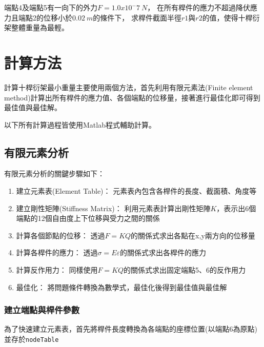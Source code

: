 \documentclass[12pt,a4paper]{article}
\begin{document}
    端點4及端點5有一向下的外力$F = 1.0x10^-7\ N$，
    在所有桿件的應力不超過降伏應力且端點2的位移小於$0.02\ m$的條件下，
    求桿件截面半徑$r1$與$r2$的值，使得十桿衍架整體重量為最輕。
    
\newpage

\section{計算方法}
    
    計算十桿衍架最小重量主要使用兩個方法，首先利用有限元素法(Finite element method)計算出所有桿件的應力值、各個端點的位移量，接著進行最佳化即可得到最佳值與最佳解。
    
    以下所有計算過程皆使用Matlab程式輔助計算。
    
    \subsection{有限元素分析}
        
        有限元素分析的關鍵步驟如下：
        \begin{enumerate}
            \item 建立元素表(Element Table)：
                  元素表內包含各桿件的長度、截面積、角度等
            \item 建立剛性矩陣(Stiffness Matrix)：
                  利用元素表計算出剛性矩陣$K$，表示出6個端點的12個自由度上下位移與受力之間的關係
            \item 計算各個節點的位移：
                  透過$F=KQ$的關係式求出各點在x,y兩方向的位移量
            \item 計算各桿件的應力：
                  透過$\sigma=E\varepsilon$的關係式求出各桿件的應力
            \item 計算反作用力：
                  同樣使用$F=KQ$的關係式求出固定端點5、6的反作用力
            \item 最佳化：
                  將問題條件轉換為數學式，最佳化後得到最佳值與最佳解
        \end{enumerate}
        
        \newpage

        \subsubsection{建立端點與桿件參數}
        
            為了快速建立元素表，首先將桿件長度轉換為各端點的座標位置(以端點6為原點)並存於\texttt{nodeTable}
            
            
\end{document}
